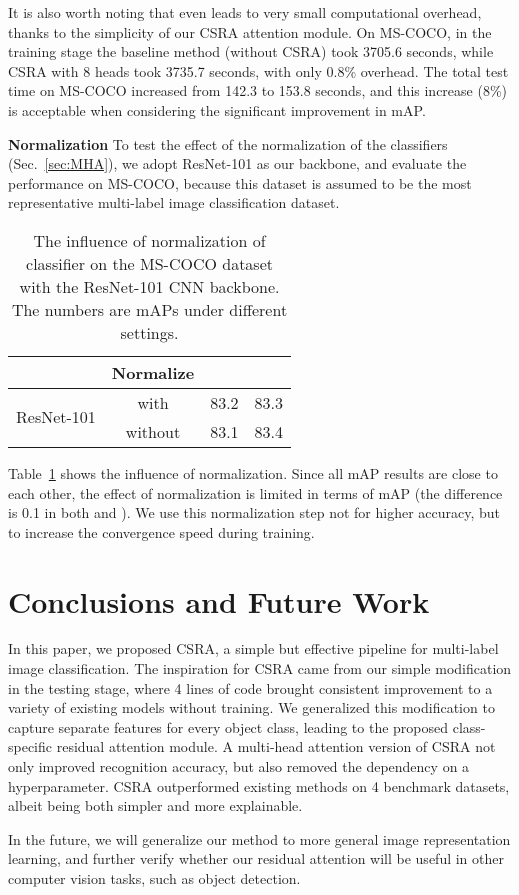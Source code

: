 \documentclass[10pt,twocolumn,letterpaper]{article}
\begin{document}
It is also worth noting that even  leads to very small computational overhead, thanks to the simplicity of our CSRA attention module. On MS-COCO, in the training stage the baseline method (without CSRA) took 3705.6 seconds, while CSRA with 8 heads took 3735.7 seconds, with only 0.8\% overhead. The total test time on MS-COCO increased from 142.3 to 153.8 seconds, and this increase (8\%) is acceptable when considering the significant improvement in mAP.

\vspace{6pt}\noindent\textbf{Normalization} To test the effect of the normalization of the classifiers  (Sec.~\ref{sec:MHA}), we adopt ResNet-101 as our backbone, and evaluate the performance on MS-COCO, because this dataset is assumed to be the most representative multi-label image classification dataset.

\begin{table}
	\caption{The influence of normalization of classifier on the MS-COCO dataset with the ResNet-101 CNN backbone. The numbers are mAPs under different settings.}
	\label{tab:normalize}
	\centering
	\small
	\begin{tabular}{c|c|c|l}
		\hline
		                            & Normalize &          &            \\ \hline\hline
		\multirow{2}{*}{ResNet-101} & with     & 83.2          & 83.3          \\ \cline{2-4}
		                            & without   & 83.1          & 83.4 \\ \hline
	\end{tabular}
\end{table}

Table~\ref{tab:normalize} shows the influence of normalization. Since all mAP results are close to each other, the effect of normalization is limited in terms of mAP (the difference is 0.1 in both  and ). We use this normalization step not for higher accuracy, but to increase the convergence speed during training.

\section{Conclusions and Future Work}

In this paper, we proposed CSRA, a simple but effective pipeline for multi-label image classification. The inspiration for CSRA came from our simple modification in the testing stage, where 4 lines of code brought consistent improvement to a variety of existing models without training. We generalized this modification to capture separate features for every object class, leading to the proposed class-specific residual attention module. A multi-head attention version of CSRA not only improved recognition accuracy, but also removed the dependency on a hyperparameter. CSRA outperformed existing methods on 4 benchmark datasets, albeit being both simpler and more explainable.

In the future, we will generalize our method to more general image representation learning, and further verify whether our residual attention will be useful in other computer vision tasks, such as object detection.


{\small


}
\end{document}
